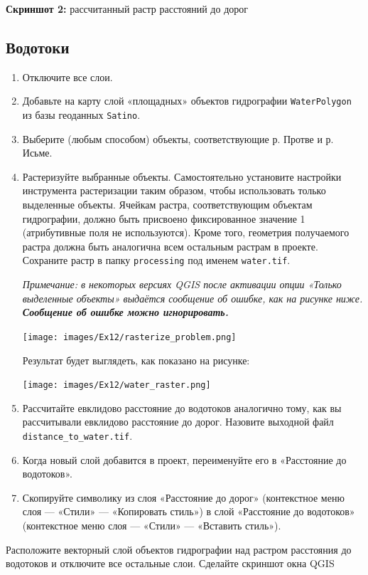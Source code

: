 \documentclass[
  12pt,
]{book}
\begin{document}
\textbf{Скриншот 2:} рассчитанный растр расстояний до дорог

\hypertarget{weighted-overlay-streams}{%
\subsection{Водотоки}\label{weighted-overlay-streams}}

\begin{enumerate}
\def\labelenumi{\arabic{enumi}.}
\item
  Отключите все слои.
\item
  Добавьте на карту слой «площадных» объектов гидрографии \texttt{WaterPolygon} из базы геоданных \texttt{Satino}.
\item
  Выберите (любым способом) объекты, соответствующие р. Протве и р. Исьме.
\item
  Растеризуйте выбранные объекты. Самостоятельно установите настройки инструмента растеризации таким образом, чтобы использовать только выделенные объекты. Ячейкам растра, соответствующим объектам гидрографии, должно быть присвоено фиксированное значение 1 (атрибутивные поля не используются). Кроме того, геометрия получаемого растра должна быть аналогична всем остальным растрам в проекте. Сохраните растр в папку \texttt{processing} под именем \texttt{water.tif}.

  \emph{Примечание: в некоторых версиях QGIS после активации опции «Только выделенные объекты» выдаётся сообщение об ошибке, как на рисунке ниже. \textbf{Сообщение об ошибке можно игнорировать.}}

  \texttt{[image: images/Ex12/rasterize\_problem.png]}

  Результат будет выглядеть, как показано на рисунке:

  \texttt{[image: images/Ex12/water\_raster.png]}
\item
  Рассчитайте евклидово расстояние до водотоков аналогично тому, как вы рассчитывали евклидово расстояние до дорог. Назовите выходной файл \texttt{distance\_to\_water.tif}.
\item
  Когда новый слой добавится в проект, переименуйте его в «Расстояние до водотоков».
\item
  Скопируйте символику из слоя «Расстояние до дорог» (контекстное меню слоя --- «Стили» --- «Копировать стиль») в слой «Расстояние до водотоков» (контекстное меню слоя --- «Стили» --- «Вставить стиль»).
\end{enumerate}

Расположите векторный слой объектов гидрографии над растром расстояния до водотоков и отключите все остальные слои. Сделайте скриншот окна QGIS
\end{document}
